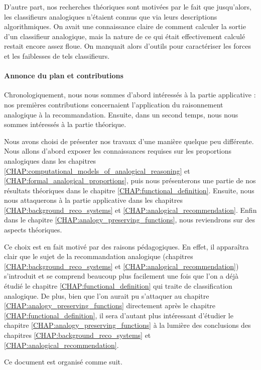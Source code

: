 D'autre part, nos recherches théoriques sont motivées par le fait que
jusqu'alors, les classifieurs analogiques n'étaient connus que via leurs
descriptions algorithmiques. On avait une connaissance claire de comment
calculer la sortie d'un classifieur analogique, mais la nature de ce qui était
effectivement calculé restait encore assez floue. On manquait alors d'outils
pour caractériser les forces et les faiblesses de tels classifieurs.

\paragraph{Annonce du plan et contributions\\}

Chronologiquement, nous nous sommes d'abord intéressés à la partie applicative :
nos premières contributions concernaient l'application du raisonnement
analogique à la recommandation. Ensuite, dans un second temps, nous nous sommes
intéressés à la partie théorique.

Nous avons choisi de présenter nos travaux d'une manière quelque peu
différente. Nous allons d'abord exposer les connaissances requises sur les
proportions analogiques dans les chapitres
\ref{CHAP:computational_models_of_analogical_reasoning}  et
\ref{CHAP:formal_analogical_proportions}, puis nous présenterons une partie de
nos résultats théoriques dans le chapitre  \ref{CHAP:functional_definition}.
Ensuite, nous nous attaquerons à la partie applicative dans les chapitres
\ref{CHAP:background_reco_systems} et \ref{CHAP:analogical_recommendation}.
Enfin dans le chapitre \ref{CHAP:analogy_preserving_functions},  nous
reviendrons sur des aspects théoriques.

Ce choix est en fait motivé par des raisons pédagogiques. En effet, il
apparaîtra clair que le sujet de la recommandation analogique (chapitres
\ref{CHAP:background_reco_systems} et \ref{CHAP:analogical_recommendation})
s'introduit et se comprend beaucoup plus facilement une fois que l'on a déjà
étudié le chapitre \ref{CHAP:functional_definition} qui traite de
classification analogique. De plus, bien que l'on aurait pu s'attaquer au
chapitre  \ref{CHAP:analogy_preserving_functions} directement après le chapitre
\ref{CHAP:functional_definition}, il sera d'autant plus intéressant d'étudier
le chapitre  \ref{CHAP:analogy_preserving_functions} à la lumière des
conclusions des chapitres \ref{CHAP:background_reco_systems} et
\ref{CHAP:analogical_recommendation}.

Ce document est organisé comme suit.\\

